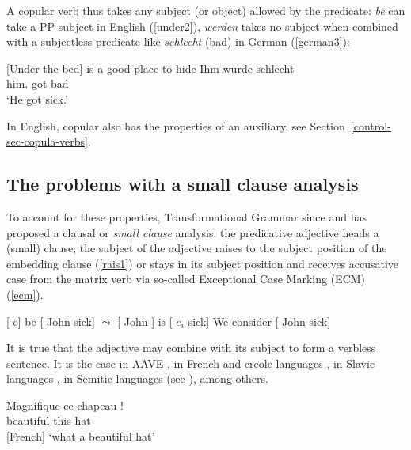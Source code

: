 \documentclass[output=paper
	        ,collection
	        ,collectionchapter
 	        ,biblatex
                ,babelshorthands
                ,newtxmath
                ,draftmode
                ,colorlinks, citecolor=brown
]{./langsci/langscibook}
\begin{document}
A copular verb thus takes any subject (or object) allowed by the predicate: \emph{be} can take a PP subject in English (\ref{under2}), \emph{werden} takes no subject when combined with a subjectless predicate like \emph{schlecht} (bad) in German (\ref{german3}):

\eal
\ex{}[Under the bed] is a good place to hide \label{under2}
\ex 
\gll Ihm        wurde schlecht \citep[]{Mueller2002b}\label{german3}\\
     him.\DAT{} got bad\\
\glt `He got sick.'
\zl

 In English, copular  also has the properties of an auxiliary, see Section~\ref{control-sec-copula-verbs}.

\subsection{The problems with a small clause analysis}

To account for these properties, Transformational Grammar since \citet{Stowell1983} and
\citet{Chomsky1986} has proposed a clausal or \emph{small clause} analysis: the predicative
adjective heads a (small) clause; the subject of the adjective raises to the subject position of the
embedding clause (\ref{rais1}) or stays in its subject position and receives accusative case from
the matrix verb via so-called Exceptional Case Marking (ECM) (\ref{ecm}).


\begin{exe}
\ex  {}[ e] be [ John sick] $\leadsto$  [ John ] is  [ $e_{i}$ sick] \label{rais1}
\ex   We consider [ John sick] \label{ecm}
\end{exe}

It is true that the adjective may combine with its subject to form a verbless sentence. It is the
case in AAVE \citep{Bender2001a}, in French \citet{Laurens2008} and creole languages
\citet{HenriandAbeille2007}, in Slavic languages \citep{Zec87a-u}, in Semitic languages (see
\citealp{Alqurashi:Borsley:14}), among others. 

\begin{exe}
\ex \gll Magnifique ce chapeau !\\
beautiful this hat\\\hfill{[French]}
\glt `what a beautiful hat'
\end{exe}
\end{document}
